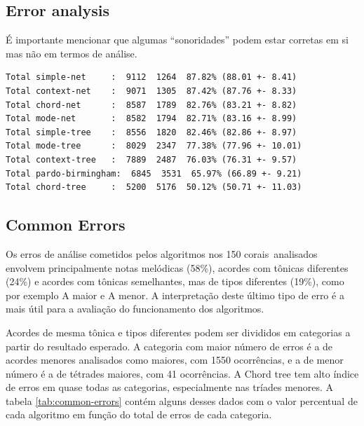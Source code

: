 \documentclass{article}
\begin{document}
\subsection{Error analysis}
\label{sec:comparison-results}

É importante mencionar que algumas ``sonoridades'' podem estar
corretas em si mas não em termos de análise.

\begin{verbatim}
Total simple-net     :  9112  1264  87.82% (88.01 +- 8.41)
Total context-net    :  9071  1305  87.42% (87.76 +- 8.33)
Total chord-net      :  8587  1789  82.76% (83.21 +- 8.82)
Total mode-net       :  8582  1794  82.71% (83.16 +- 8.99)
Total simple-tree    :  8556  1820  82.46% (82.86 +- 8.97)
Total mode-tree      :  8029  2347  77.38% (77.96 +- 10.01)
Total context-tree   :  7889  2487  76.03% (76.31 +- 9.57)
Total pardo-birmingham:  6845  3531  65.97% (66.89 +- 9.21)
Total chord-tree     :  5200  5176  50.12% (50.71 +- 11.03)
\end{verbatim}


\subsection{Common Errors}

Os erros de análise cometidos pelos algoritmos nos 150 corais\
analisados envolvem principalmente notas melódicas (58\%), acordes com
tônicas diferentes (24\%) e acordes com tônicas semelhantes, mas de
tipos diferentes (19\%), como por exemplo A maior e A menor. A
interpretação deste último tipo de erro é a mais útil para a avaliação
do funcionamento dos algoritmos.

Acordes de mesma tônica e tipos diferentes podem ser divididos em
categorias a partir do resultado esperado. A categoria com maior
número de erros é a de acordes menores analisados como maiores, com
1550 ocorrências, e a de menor número é a de tétrades maiores, com 41
ocorrências. A Chord tree tem alto índice de erros em quase todas as
categorias, especialmente nas tríades menores. A tabela
\ref{tab:common-errors} contém alguns desses dados com o valor
percentual de cada algoritmo em função do total de erros de cada
categoria.
\end{document}
